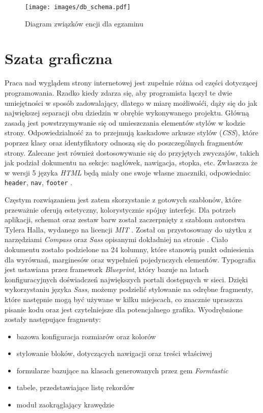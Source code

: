 \documentclass[12pt,twoside]{report}
\begin{document}
\begin{figure}[ht]
  \begin{center}
    \texttt{[image: images/db\_schema.pdf]}
  \end{center}
  \caption{Diagram związków encji dla egzaminu}
  \label{fig:db_schema}
\end{figure}

\section{Szata graficzna}
Praca nad wyglądem strony internetowej jest zupełnie różna od części dotyczącej
programowania. Rzadko kiedy zdarza się, aby programista łączył te dwie umiejętności w
sposób zadowalający, dlatego w miarę możliwośći, dąży się do jak największej separacji obu
dziedzin w obrębie wykonywanego projektu. Główną zasadą jest powstrzymywanie się od
umieszczania elementów stylów w kodzie strony. Odpowiedzialność za to przejmują kaskadowe
arkusze stylów (\emph{CSS}), które poprzez klasy oraz identyfikatory odnoszą się do
poszczególnych fragmentów strony. Zalecane jest również dostosowywanie się do przyjętych
zwyczajów, takich jak podział dokumentu na sekcje: nagłówek, nawigacja, stopka, etc.
Zwłaszcza że w wersji 5 języka \emph{HTML} będą miały one swoje własne znaczniki,
odpowiednio: \texttt{header}, \texttt{nav}, \texttt{footer} \cite{html5}.


Częstym rozwiązaniem jest zatem skorzystanie z gotowych szablonów, które przeważnie oferują
estetyczny, kolorystycznie spójny interfejs. Dla potrzeb aplikacji, schemat oraz zestaw
barw został zaczerpnięty z szablonu autorstwa Tylera Halla, wydanego na licencji
\emph{MIT} \cite{yui-app-theme}. Został on przystosowany do użytku z narzędziami
\emph{Compass} oraz \emph{Sass} opisanymi dokładniej na stronie \pageref{sec:compass}.
Ciało dokumentu zostało podzielone na 24 kolumny, które stanowią punkt odniesienia dla
wyrównań, marginesów oraz wypełnień pojedynczych elementów. Typografia jest ustawiana
przez framework \emph{Blueprint}, który bazuje na latach konfiguracyjnych doświadczeń
największych portali dostępnych w sieci. Dzięki wykorzystaniu języka \emph{Sass}, możemy
podzielić stylowanie na odrębne fragmenty, które następnie mogą być używane w kilku
miejscach, co znacznie upraszcza pisanie kodu oraz jest czytelniejsze dla potencjalnego
grafika. Wyodrębnione zostały następujące fragmenty:

\begin{itemize}
  \item{bazowa konfiguracja rozmiarów oraz kolorów}
  \item{stylowanie bloków, dotyczących nawigacji oraz treści właściwej}
  \item{formularze bazujące na klasach generowanych przez gem \emph{Formtastic}}
  \item{tabele, przedstawiające listę rekordów}
  \item{moduł zaokrąglający krawędzie}
\end{itemize}
\end{document}
